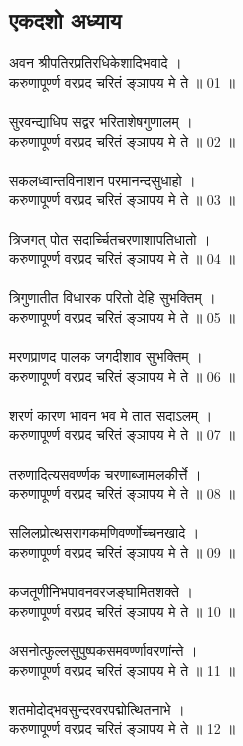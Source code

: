 \subsection{\sanskrit एकदशो अध्याय}
\sanskrit
अवन श्रीपतिरप्रतिरधिकेशादिभवादे ।\\
करुणापूर्ण्ण वरप्रद चरितं ङ्ञापय मे ते ॥ 01 ॥\\
\\
सुरवन्द्याधिप सद्वर भरिताशेषगुणालम् ।\\
करुणापूर्ण्ण वरप्रद चरितं ङ्ञापय मे ते ॥ 02 ॥\\
\\
सकलध्वान्तविनाशन परमानन्दसुधाहो ।\\
करुणापूर्ण्ण वरप्रद चरितं ङ्ञापय मे ते ॥ 03 ॥\\
\\
त्रिजगत् पोत सदार्च्चितचरणाशापतिधातो ।\\
करुणापूर्ण्ण वरप्रद चरितं ङ्ञापय मे ते ॥ 04 ॥\\
\\
त्रिगुणातीत विधारक परितो देहि सुभक्तिम् ।\\
करुणापूर्ण्ण वरप्रद चरितं ङ्ञापय मे ते ॥ 05 ॥\\
\\
मरणप्राणद पालक जगदीशाव सुभक्तिम् ।\\
करुणापूर्ण्ण वरप्रद चरितं ङ्ञापय मे ते ॥ 06 ॥\\
\\
शरणं कारण भावन भव मे तात सदाऽलम् ।\\
करुणापूर्ण्ण वरप्रद चरितं ङ्ञापय मे ते ॥ 07 ॥\\
\\
तरुणादित्यसवर्ण्णक चरणाब्जामलकीर्त्ते ।\\
करुणापूर्ण्ण वरप्रद चरितं ङ्ञापय मे ते ॥ 08 ॥\\
\\
सलिलप्रोत्थसरागकमणिवर्ण्णोच्चनखादे ।\\
करुणापूर्ण्ण वरप्रद चरितं ङ्ञापय मे ते ॥ 09 ॥\\
\\
कजतूणीनिभपावनवरजङ्घामितशक्ते ।\\
करुणापूर्ण्ण वरप्रद चरितं ङ्ञापय मे ते ॥ 10 ॥\\
\\
असनोत्फुल्लसुपुष्पकसमवर्ण्णावरणांन्ते ।\\
करुणापूर्ण्ण वरप्रद चरितं ङ्ञापय मे ते ॥ 11 ॥\\
\\
शतमोदोद्भवसुन्दरवरपद्मोत्थितनाभे ।\\
करुणापूर्ण्ण वरप्रद चरितं ङ्ञापय मे ते ॥ 12 ॥\\
